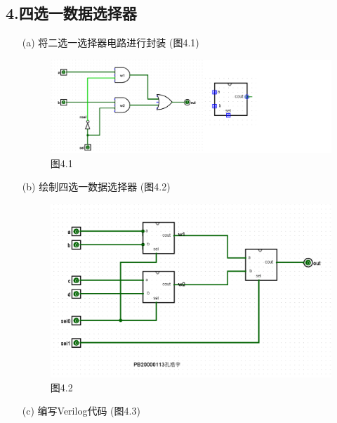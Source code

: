 \documentclass{article}
\begin{document}
        \subsection*{4.四选一数据选择器}
            \begin{enumerate}
                \item [(a)]将二选一选择器电路进行封装 (图4.1)
                \begin{figure}[htbp]
                    \centering
                    \includegraphics[scale=0.5]{t41.png}
                    \caption*{图4.1}
                \end{figure}
                \item [(b)]绘制四选一数据选择器 (图4.2)
                \begin{figure}[htbp]
                    \centering
                    \includegraphics[scale=0.6]{t42.png}
                    \caption*{图4.2}
                \end{figure}
                \item [(c)]编写Verilog代码 (图4.3)
                \begin{figure}[htbp]
                    \centering

\end{figure}
\end{enumerate}
\end{document}
